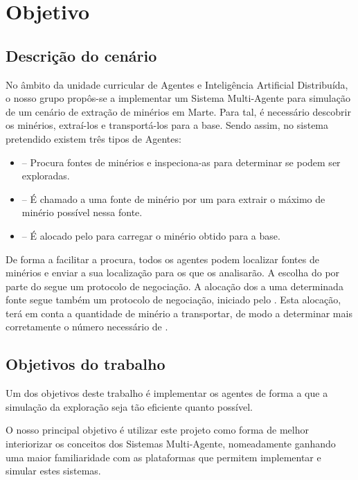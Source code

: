 \documentclass[12pt]{report}
\begin{document}
\tableofcontents


\chapter{Objetivo}

\section{Descrição do cenário}
No âmbito da unidade curricular de Agentes e Inteligência Artificial Distribuída, o nosso grupo propôs-se a implementar um Sistema Multi-Agente para simulação de um cenário de extração de minérios em Marte. Para tal, é necessário descobrir os minérios, extraí-los e transportá-los para a base. Sendo assim, no sistema pretendido existem três tipos de Agentes:

\begin{itemize}
	\item \Spotter – Procura fontes de minérios e inspeciona-as para determinar se podem ser exploradas. 
	\item \Producer – É chamado a uma fonte de minério por um \spotter para extrair o máximo de minério possível nessa fonte. 
	\item \Transporter – É alocado pelo \producer para carregar o minério obtido para a base.
\end{itemize}

De forma a facilitar a procura, todos os agentes podem localizar fontes de minérios e enviar a sua localização para os \spotters que os analisarão. A escolha do \producer por parte do \spotter segue um protocolo de negociação. A alocação dos \transporters a uma determinada fonte segue também um protocolo de negociação, iniciado pelo \producer. Esta alocação, terá em conta a quantidade de minério a transportar, de modo a determinar mais corretamente o número necessário de \transporters.

\section{Objetivos do trabalho}

Um dos objetivos deste trabalho é implementar os agentes de forma a que a simulação da exploração seja tão eficiente quanto possível. 

O nosso principal objetivo é utilizar este projeto como forma de melhor interiorizar os conceitos dos Sistemas Multi-Agente, nomeadamente ganhando uma maior familiaridade com as plataformas que permitem implementar e simular estes sistemas.
\end{document}
